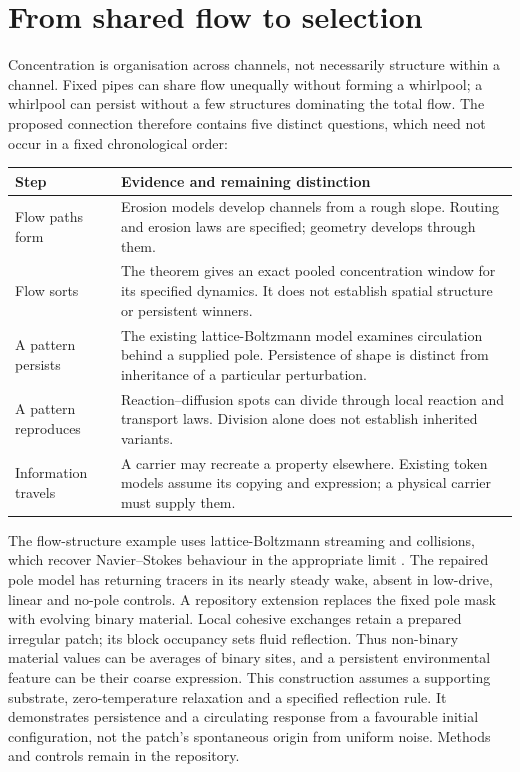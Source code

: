 \section{From shared flow to selection}
\label{sec:thought}

Concentration is organisation across channels, not necessarily structure within
a channel. Fixed pipes can share flow unequally without forming a whirlpool;
a whirlpool can persist without a few structures dominating the total flow.
The proposed connection therefore contains five distinct questions, which need
not occur in a fixed chronological order:

\begin{center}
\begin{tabular}{@{}p{.25\linewidth}p{.70\linewidth}@{}}
\toprule
Step & Evidence and remaining distinction \\
\midrule
Flow paths form & Erosion models develop channels from a rough slope. Routing
and erosion laws are specified; geometry develops through them. \\[3pt]
Flow sorts & The theorem gives an exact pooled concentration window for its
specified dynamics. It does not establish spatial structure or persistent winners. \\[3pt]
A pattern persists & The existing lattice-Boltzmann model examines circulation
behind a supplied pole. Persistence of shape is distinct from inheritance of a
particular perturbation. \\[3pt]
A pattern reproduces & Reaction--diffusion spots can divide through local
reaction and transport laws. Division alone does not establish inherited variants. \\[3pt]
Information travels & A carrier may recreate a property elsewhere. Existing token
models assume its copying and expression; a physical carrier must supply them. \\
\bottomrule
\end{tabular}
\end{center}

The flow-structure example uses lattice-Boltzmann streaming and collisions,
which recover Navier--Stokes behaviour in the appropriate limit \cite{lbm}.
The repaired pole model has returning tracers in its nearly steady wake,
absent in low-drive, linear and no-pole controls. A repository extension replaces
the fixed pole mask with evolving binary material. Local cohesive exchanges
retain a prepared irregular patch; its block occupancy sets fluid reflection.
Thus non-binary material values can be averages of binary sites, and a persistent
environmental feature can be their coarse expression. This construction assumes
a supporting substrate, zero-temperature relaxation and a specified reflection
rule. It demonstrates persistence and a circulating response from a favourable
initial configuration, not the patch's spontaneous origin from uniform noise.
Methods and controls remain in the repository.

